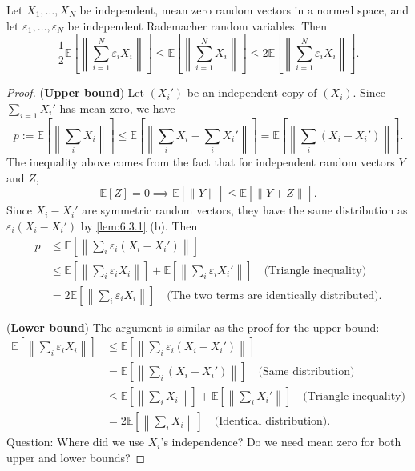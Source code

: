 \begin{lemma}[Symmetrization]
\label{lem:6.3.2}
Let $X_1, \dots, X_N$ be independent, mean zero random vectors in a normed space, and let $\varepsilon_1, 
\dots, \varepsilon_N$ be independent Rademacher random variables. Then 
\[ \frac{1}{2}\mathbb{E}\left[ \left\lVert \sum_{i = 1}^{N} \varepsilon_i X_i \right\rVert_{} \right] 
\leq \mathbb{E}\left[ \left\lVert \sum_{i = 1}^{N} X_i \right\rVert_{} \right] 
\leq 2 \mathbb{E}\left[ \left\lVert \sum_{i = 1}^{N} \varepsilon_i X_i \right\rVert_{} \right]. \]
\end{lemma}

\begin{proof}
(\textbf{Upper bound}) Let $(X_i')$ be an independent copy of $(X_i)$. Since $\sum_{i = 1}^{} X_i'$ has mean 
zero, we have 
\[ p := \mathbb{E}\left[ \left\lVert \sum_{i}^{} X_i \right\rVert \right] 
\leq \mathbb{E}\left[ \left\lVert \sum_{i}^{} X_i - \sum_{i}^{} X_i' \right\rVert \right] 
= \mathbb{E}\left[ \left\lVert \sum_{i}^{} (X_i - X_i') \right\rVert \right]. \]
The inequality above comes from the fact that for independent random vectors $Y$ and $Z$, 
\[ \mathbb{E}[Z] = 0 \implies \mathbb{E}[\lVert Y \rVert_{}] \leq \mathbb{E}[\lVert Y + Z \rVert_{}]. \]
Since $X_i - X_i'$ are symmetric random vectors, they have the same distribution as 
$\varepsilon_i (X_i - X_i')$ by \cref{lem:6.3.1} (b). Then 
\begin{align*}
	p 
	&\leq \mathbb{E}\left[ \left\lVert \sum_{i}^{} \varepsilon_i (X_i - X_i') \right\rVert \right] \\
	&\leq \mathbb{E}\left[ \left\lVert \sum_{i}^{} \varepsilon_i X_i \right\rVert \right] 
	+ \mathbb{E}\left[ \left\lVert \sum_{i}^{} \varepsilon_i X_i' \right\rVert \right] \quad 
	\text{(Triangle inequality)} \\
	&= 2 \mathbb{E}\left[ \left\lVert \sum_{i}^{} \varepsilon_i X_i \right\rVert \right] \quad 
	\text{(The two terms are identically distributed)}.
\end{align*}

(\textbf{Lower bound}) The argument is similar as the proof for the upper bound:
\begin{align*}
	\mathbb{E}\left[ \left\lVert \sum_{i}^{} \varepsilon_i X_i \right\rVert \right] 
	&\leq \mathbb{E}\left[ \left\lVert \sum_{i}^{} \varepsilon_i (X_i - X_i') \right\rVert \right] \\
	&= \mathbb{E}\left[ \left\lVert \sum_{i}^{} (X_i - X_i') \right\rVert \right] \quad 
	\text{(Same distribution)} \\
	&\leq \mathbb{E}\left[ \left\lVert \sum_{i}^{} X_i \right\rVert \right] 
	+ \mathbb{E}\left[ \left\lVert \sum_{i}^{} X_i' \right\rVert \right] \quad \text{(Triangle inequality)} \\
	&= 2 \mathbb{E}\left[ \left\lVert \sum_{i}^{} X_i \right\rVert \right] \quad 
	\text{(Identical distribution)}.
\end{align*}
Question: Where did we use $X_i$'s independence? Do we need mean zero for both upper and lower bounds?
\end{proof}

